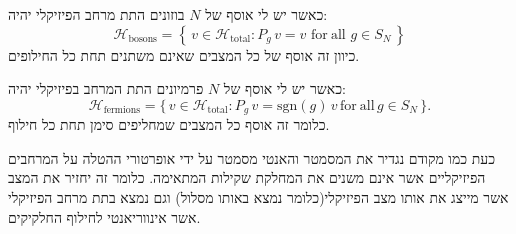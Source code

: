 \documentclass{tstextbook}
\begin{document}
\begin{proposition}
כאשר יש לי אוסף של \(N\) בוזונים התת מרחב הפיזיקלי יהיה:
$${\mathcal{H}}_{\text{bosons}}=\left\{\,v\in{\mathcal{H}}_{\mathrm{total}}:P_{g}\,v=v\,\,\mathrm{for~all}\,\,g\in S_{N}\,\right\}$$
כיוון זה אוסף של כל המצבים שאינם משתנים תחת כל החילופים.

\end{proposition}
\begin{proposition}
כאשר יש לי אוסף של \(N\) פרמיונים התת המרחב בפיזיקלי יהיה:
$${\mathcal{H}}_{\mathrm{fermions}}=\{\,v\in{\mathcal{H}}_{\mathrm{total}}:P_{g}\,v=\mathrm{sgn}(g)\,v\,\mathrm{for~all}\,g\in S_{N}\,\}.$$
כלומר זה אוסף כל המצבים שמחליפים סימן תחת כל חילוף.

\end{proposition}
כעת כמו מקודם נגדיר את המסמטר והאנטי מסמטר על ידי אופרטורי ההטלה על המרחבים הפיזיקליים אשר אינם משנים את המחלקת שקילות המתאימה. כלומר זה יחזיר את המצב אשר מייצג את אותו מצב הפיזיקלי(כלומר נמצא באותו מסלול) וגם נמצא בתת מרחב הפיזיקלי אשר אינווריאנטי לחילוף החלקיקים.
\end{document}
